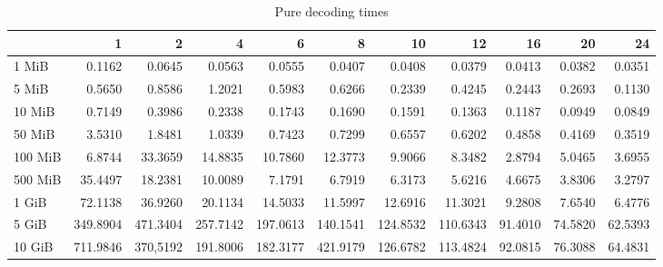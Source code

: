 \begin{table}[!h]
	\caption{Pure decoding times}
\begin{tabular}{lrrrrrrrrrr}
	\toprule
		\diagbox{File sizes }{Threads} &        1  &        2  &        4  &        6  &        8  &        10 &        12 &       16 &       20 &       24 \\
	\midrule
	1 MiB   &    0.1162 &    0.0645 &    0.0563 &    0.0555 &    0.0407 &    0.0408 &    0.0379 &   0.0413 &   0.0382 &   0.0351 \\
	5 MiB   &    0.5650 &    0.8586 &    1.2021 &    0.5983 &    0.6266 &    0.2339 &    0.4245 &   0.2443 &   0.2693 &   0.1130 \\
	10 MiB  &    0.7149 &    0.3986 &    0.2338 &    0.1743 &    0.1690 &    0.1591 &    0.1363 &   0.1187 &   0.0949 &   0.0849 \\
	50 MiB  &    3.5310 &    1.8481 &    1.0339 &    0.7423 &    0.7299 &    0.6557 &    0.6202 &   0.4858 &   0.4169 &   0.3519 \\
	100 MiB &    6.8744 &   33.3659 &   14.8835 &   10.7860 &   12.3773 &    9.9066 &    8.3482 &   2.8794 &   5.0465 &   3.6955 \\
	500 MiB &   35.4497 &   18.2381 &   10.0089 &    7.1791 &    6.7919 &    6.3173 &    5.6216 &   4.6675 &   3.8306 &   3.2797 \\
	1 GiB   &   72.1138 &   36.9260 &   20.1134 &   14.5033 &   11.5997 &   12.6916 &   11.3021 &   9.2808 &   7.6540 &   6.4776 \\
	5 GiB   &  349.8904 &  471.3404 &  257.7142 &  197.0613 &  140.1541 &  124.8532 &  110.6343 &  91.4010 &  74.5820 &  62.5393 \\
	10 GiB  &  711.9846 &  370,5192&  191.8006 &  182.3177 &  421.9179 &  126.6782 &  113.4824 &  92.0815 &  76.3088 &  64.4831 \\
	\bottomrule
\end{tabular}
\end{table}

